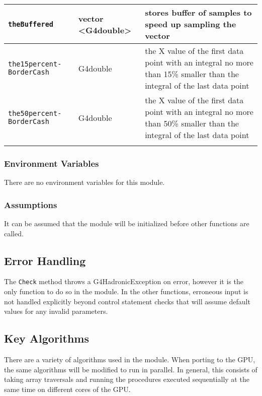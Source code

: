 \documentclass[12pt]{article}
\begin{document}
\begin{table}[h]
\begin{tabularx}{\textwidth}{p{}p{}p{}}
\texttt{theBuffered} & vector \textless G4double\textgreater & stores buffer of samples to speed up sampling the vector \\\hline
\texttt{the15percent- BorderCash} & G4double & the X value of the first data point with an integral no more than 15\% smaller than the integral of the last data point \\\hline
\texttt{the50percent- BorderCash} & G4double & the X value of the first data point with an integral no more than 50\% smaller than the integral of the last data point\\
\arrayrulecolor{black}
\bottomrule
\end{tabularx}
\end{table}
\clearpage

\subsubsection{Environment Variables}%
There are no environment variables for this module.

\subsubsection{Assumptions}%
It can be assumed that the module will be initialized before other functions are called.

\subsection{Error Handling}
The \texttt{Check} method throws a G4HadronicException on error, however it is the only function to do so in the module. In the other functions, erroneous input is not handled explicitly beyond control statement checks that will assume default values for any invalid parameters.

\subsection{Key Algorithms}
There are a variety of algorithms used in the module. When porting to the GPU, the same algorithms will be modified to run in parallel. In general, this consists of taking array traversals and running the procedures executed sequentially at the same time on different cores of the GPU. 


\end{document}
